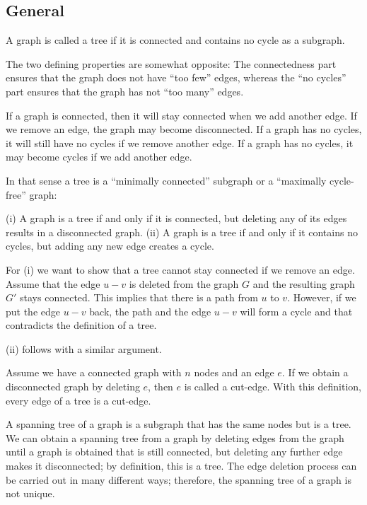 
\subsection{General}


\begin{definition}
A graph is called a tree if it is connected and contains no cycle as a subgraph.
\end{definition}

The two defining properties are somewhat opposite: The connectedness part ensures that the graph does not have ``too few'' edges, whereas the ``no cycles'' part ensures that the graph has not ``too many'' edges.

If a graph is connected, then it will stay connected when we add another edge. If we remove an edge, the graph may become disconnected. If a graph has no cycles, it will still have no cycles if we remove another edge. If a graph has no cycles, it may become cycles if we add another edge.

In that sense a tree is a ``minimally connected'' subgraph or a ``maximally cycle-free'' graph:

\begin{theorem}
(i) A graph is a tree if and only if it is connected, but deleting any of its edges results in a disconnected graph. (ii) A graph is a tree if and only if it contains no cycles, but adding any new edge creates a cycle.
\end{theorem}

For (i) we want to show that a tree cannot stay connected if we remove an edge. Assume that the edge $u-v$ is deleted from the graph $G$ and the resulting graph $G'$ stays connected. This implies that there is a path from $u$ to $v$. However, if we put the edge $u-v$ back, the path and the edge $u-v$ will form a cycle and that contradicts the definition of a tree.

(ii) follows with a similar argument.

Assume we have a connected graph with $n$ nodes and an edge $e$. If we obtain a disconnected graph by deleting $e$, then $e$ is called a cut-edge. With this definition, every edge of a tree is a cut-edge.

A spanning tree of a graph is a subgraph that has the same nodes but is a tree. We can obtain a spanning tree from a graph by deleting edges from the graph until a graph is obtained that is still connected, but deleting any further edge makes it disconnected; by definition, this is a tree. The edge deletion process can be carried out in many different ways; therefore, the spanning tree of a graph is not unique.

